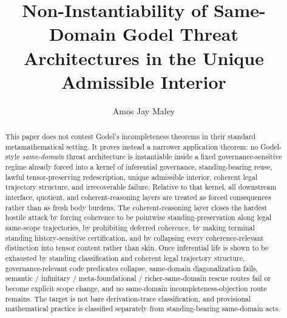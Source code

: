 \documentclass[11pt]{article}
\title{Non-Instantiability of Same-Domain Godel Threat Architectures in the Unique Admissible Interior}
\author{Amos Jay Maley}
\date{}
\begin{document}
\maketitle

\begin{abstract}
This paper does not contest Godel's incompleteness theorems in their standard metamathematical setting. It proves instead a narrower application theorem: no Godel-style \emph{same-domain} threat architecture is instantiable inside a fixed governance-sensitive regime already forced into a kernel of inferential governance, standing-bearing reuse, lawful tensor-preserving redescription, unique admissible interior, coherent legal trajectory structure, and irrecoverable failure. Relative to that kernel, all downstream interface, quotient, and coherent-reasoning layers are treated as forced consequences rather than as fresh body burdens. The coherent-reasoning layer closes the hardest hostile attack by forcing coherence to be pointwise standing-preservation along legal same-scope trajectories, by prohibiting deferred coherence, by making terminal standing history-sensitive certification, and by collapsing every coherence-relevant distinction into tensor content rather than skin. Once inferential life is shown to be exhausted by standing classification and coherent legal trajectory structure, governance-relevant code predicates collapse, same-domain diagonalization fails, semantic / infinitary / meta-foundational / richer-same-domain rescue routes fail or become explicit scope change, and no same-domain incompleteness-objection route remains. The target is not bare derivation-trace classification, and provisional mathematical practice is classified separately from standing-bearing same-domain acts.
\end{abstract}

\tableofcontents







\appendix





\end{document}
